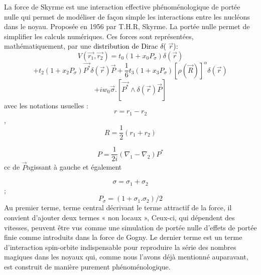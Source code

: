 \textcolor[rgb]{0.13725491,0.12156863,0.1254902}{ La force de Skyrme est une interaction effective
phénoménologique de portée nulle qui permet de modéliser de façon simple les interactions entre les nucléons dans le
noyau. Proposée en 1956 par T.H.R, Skyrme. }La portée nulle permet de simplifier les calculs numériques. Ces forces
sont représentées, mathématiquement, par une \textcolor{black}{distribution de Dirac $\delta $(} $\overrightarrow
r$\textcolor{black}{):}
\begin{equation*}
V\left(\overrightarrow{r_1},\overrightarrow{r_2}\right)=t_0(1+x_0P_{\sigma })\delta (\overrightarrow r)
\end{equation*}
 \begin{equation}+t_2\left(1+x_2P_{\sigma }\right)\overrightarrow{P^{\ast }}\delta \left(\overrightarrow
r\right)\overrightarrow P+\frac 1 6t_3(1+x_3P_{\sigma })[\rho (\overrightarrow R)]^{\alpha }\delta
\left(\overrightarrow r\right)\end{equation}
\begin{equation*}
+iw_0\overrightarrow{\sigma }.[\overrightarrow{P^{\ast }}{\wedge}\delta \left(\overrightarrow r\right)\overrightarrow P]
\end{equation*}
avec les notations usuelles :
\begin{equation}r=r_1-r_2\end{equation} , \begin{equation}R=\frac 1 2(r_1+r_2)\end{equation}

\begin{equation}P=\frac 1{2i}({\nabla}_1-{\nabla}_2)P^{\ast } \end{equation} 
cc de $\overrightarrow P$agissant à gauche et également

 \begin{equation}\sigma =\sigma _1+\sigma _2\end{equation} ; \begin{equation}P_{\sigma
}=(1+\sigma _1.\sigma _2)/2\end{equation}
\textcolor[rgb]{0.13725491,0.12156863,0.1254902}{ Au premier terme, terme central décrivant le terme
attractif de la force, il convient d'ajouter deux termes « non locaux », Ceux-ci, qui dépendent des vitesses, peuvent
être vus}\textit{\textcolor[rgb]{0.13725491,0.12156863,0.1254902}{
}}\textcolor[rgb]{0.13725491,0.12156863,0.1254902}{comme une simulation de portée nulle d'effets de portée finie comme
introduits dans la force de Gogny. Le dernier terme est un terme d'interaction spin-orbite indispensable pour
reproduire la série des nombres magiques dans les noyaux qui, comme nous l'avons déjà mentionné auparavant, est
construit de manière purement phénoménologique.}
